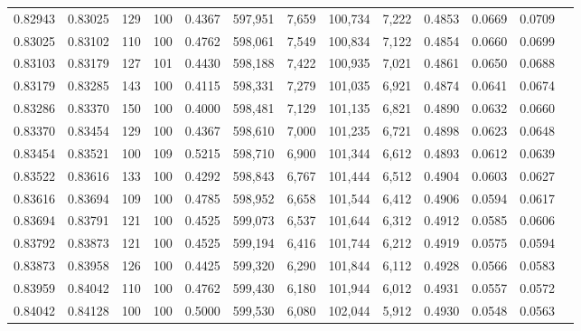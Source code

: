\begin{tabular}{rrrrrrrrrrrrr}
0.82943 & 0.83025 &   129 & 100 &                                     0.4367 & 597,951 &   7,659 & 100,734 &   7,222 & 0.4853 & 0.0669 & 0.0709 \\
0.83025 & 0.83102 &   110 & 100 &                                     0.4762 & 598,061 &   7,549 & 100,834 &   7,122 & 0.4854 & 0.0660 & 0.0699 \\
0.83103 & 0.83179 &   127 & 101 &                                     0.4430 & 598,188 &   7,422 & 100,935 &   7,021 & 0.4861 & 0.0650 & 0.0688 \\
0.83179 & 0.83285 &   143 & 100 &                                     0.4115 & 598,331 &   7,279 & 101,035 &   6,921 & 0.4874 & 0.0641 & 0.0674 \\
0.83286 & 0.83370 &   150 & 100 &                                     0.4000 & 598,481 &   7,129 & 101,135 &   6,821 & 0.4890 & 0.0632 & 0.0660 \\
0.83370 & 0.83454 &   129 & 100 &                                     0.4367 & 598,610 &   7,000 & 101,235 &   6,721 & 0.4898 & 0.0623 & 0.0648 \\
0.83454 & 0.83521 &   100 & 109 &                                     0.5215 & 598,710 &   6,900 & 101,344 &   6,612 & 0.4893 & 0.0612 & 0.0639 \\
0.83522 & 0.83616 &   133 & 100 &                                     0.4292 & 598,843 &   6,767 & 101,444 &   6,512 & 0.4904 & 0.0603 & 0.0627 \\
0.83616 & 0.83694 &   109 & 100 &                                     0.4785 & 598,952 &   6,658 & 101,544 &   6,412 & 0.4906 & 0.0594 & 0.0617 \\
0.83694 & 0.83791 &   121 & 100 &                                     0.4525 & 599,073 &   6,537 & 101,644 &   6,312 & 0.4912 & 0.0585 & 0.0606 \\
0.83792 & 0.83873 &   121 & 100 &                                     0.4525 & 599,194 &   6,416 & 101,744 &   6,212 & 0.4919 & 0.0575 & 0.0594 \\
0.83873 & 0.83958 &   126 & 100 &                                     0.4425 & 599,320 &   6,290 & 101,844 &   6,112 & 0.4928 & 0.0566 & 0.0583 \\
0.83959 & 0.84042 &   110 & 100 &                                     0.4762 & 599,430 &   6,180 & 101,944 &   6,012 & 0.4931 & 0.0557 & 0.0572 \\
0.84042 & 0.84128 &   100 & 100 &                                     0.5000 & 599,530 &   6,080 & 102,044 &   5,912 & 0.4930 & 0.0548 & 0.0563 \\

\end{tabular}
